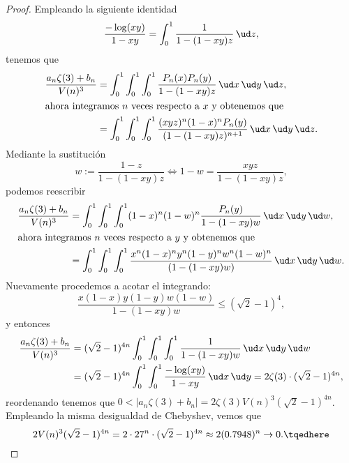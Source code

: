 \documentclass[teoria-numeros.tex]{subfiles}
\begin{document}
\begin{proof}
	Empleando la siguiente identidad
	$$ \frac{-\log(xy)}{1 - xy} = \int_{0}^{1} \frac{1}{1 - (1 - xy)z} \, \ud z, $$
	tenemos que
	\begin{align*}
		\frac{a_n \zeta(3) + b_n}{V(n)^3} &= \int_{0}^{1} \int_{0}^{1} \int_{0}^{1} \frac{P_n(x) P_n(y)}{1 - (1-xy)z} \, \ud x \, \ud y \, \ud z, \\
		\shortintertext{ahora integramos $n$ veces respecto a $x$ y obtenemos que}
						  &= \int_{0}^{1} \int_{0}^{1} \int_{0}^{1} \frac{(xyz)^n (1 - x)^n P_n(y)}{(1 - (1-xy)z)^{n+1}}
						  \, \ud x \, \ud y \, \ud z.
	\end{align*}
	Mediante la sustitución
	$$ w := \frac{1 - z}{1 - (1-xy)z} \iff 1 - w = \frac{xyz}{1 - (1-xy)z}, $$
	podemos reescribir
	\begin{align*}
		\frac{a_n \zeta(3) + b_n}{V(n)^3} &= \int_{0}^{1} \int_{0}^{1} \int_{0}^{1} (1 - x)^n (1 - w)^n \frac{P_n(y)}{1 - (1-xy)w} \, \ud x \, \ud y \, \ud w, \\
		\shortintertext{ahora integramos $n$ veces respecto a $y$ y obtenemos que}
						  &= \int_{0}^{1} \int_{0}^{1} \int_{0}^{1} \frac{x^n(1-x)^n y^n(1-y)^n w^n(1-w)^n}{(1 - (1-xy)w)}
						  \, \ud x \, \ud y \, \ud w.
	\end{align*}
	Nuevamente procedemos a acotar el integrando:
	$$ \frac{x(1 - x) y(1 - y) w(1 - w)}{1 - (1 - xy)w} \le (\sqrt{2} - 1)^4, $$
	y entonces
	\begin{align*}
		\frac{a_n \zeta(3) + b_n}{V(n)^3} &= (\sqrt{2} - 1)^{4n} \int_{0}^{1} \int_{0}^{1} \int_{0}^{1} \frac{1}{1 - (1 - xy)w} \, \ud x \, \ud y \, \ud w \\
						  &= (\sqrt{2} - 1)^{4n} \int_{0}^{1} \int_{0}^{1} \frac{-\log(xy)}{1 - xy} \, \ud x \, \ud y
						  = 2 \zeta(3) \cdot (\sqrt{2} - 1)^{4n},
	\end{align*}
	reordenando tenemos que $0 < |a_n \zeta(3) + b_n| = 2 \zeta(3) V(n)^3 (\sqrt{2} - 1)^{4n}$.
	Empleando la misma desigualdad de Chebyshev, vemos que
	\begin{equation}
		2 V(n)^3 (\sqrt{2} - 1)^{4n} = 2 \cdot 27^{n} \cdot (\sqrt{2} - 1)^{4n} \approx 2(0.7948)^n \to 0.
		\tqedhere
	\end{equation}
\end{proof}
\end{document}
